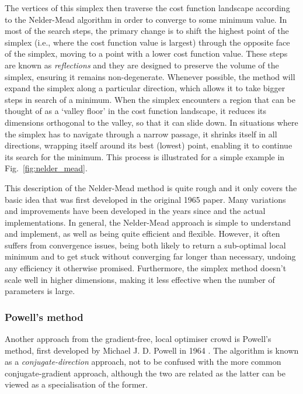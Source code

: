 The vertices of this simplex then traverse the cost function landscape according to the Nelder-Mead algorithm in order to converge to some minimum value.  In most of the search steps, the primary change is to shift the highest point of the simplex (i.e., where the cost function value is largest) through the opposite face of the simplex, moving to a point with a lower cost function value. These steps are known as \emph{reflections} and they are designed to preserve the volume of the simplex, ensuring it remains non-degenerate. Whenever possible, the method will expand the simplex along a particular direction, which allows it to take bigger steps in search of a minimum. When the simplex encounters a region that can be thought of as a `valley floor' in the cost function landscape, it reduces its dimensions orthogonal to the valley, so that it can slide down. In situations where the simplex has to navigate through a narrow passage, it shrinks itself in all directions, wrapping itself around its best (lowest) point, enabling it to continue its search for the minimum. This process is illustrated for a simple example in Fig.~\ref{fig:nelder_mead}.

This description of the Nelder-Mead method is quite rough and it only covers the basic idea that was first developed in the original 1965 paper. Many variations and improvements have been developed in the years since and the actual implementations. In general, the Nelder-Mead approach is simple to understand and implement, as well as being quite efficient and flexible. However, it often suffers from convergence issues, being both likely to return a sub-optimal local minimum and to get stuck without converging far longer than necessary, undoing any efficiency it otherwise promised. Furthermore, the simplex method doesn't scale well in higher dimensions, making it less effective when the number of parameters is large.

\subsubsection{Powell's method}\label{sec:3.1.3.2_Powell}

Another approach from the gradient-free, local optimiser crowd is Powell's method, first developed by Michael J. D. Powell in 1964 \cite{powell_efficient_1964}. The algorithm is known as a \emph{conjugate-direction} approach, not to be confused with the more common conjugate-gradient approach, although the two are related as the latter can be viewed as a specialisation of the former. 

